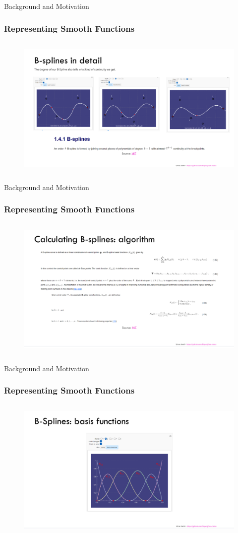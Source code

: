 \documentclass[serif, aspectratio=169]{beamer}
\begin{document}
\begin{frame}{Background and Motivation}
    \frametitle<presentation>{Representing Smooth Functions}
    \begin{figure}
        \centering
        \includegraphics[height=7cm]{image copy 3.png}
    \end{figure}
\end{frame}
\begin{frame}{Background and Motivation}
    \frametitle<presentation>{Representing Smooth Functions}
    \begin{figure}
        \centering
        \includegraphics[height=7cm]{image copy 4.png}
    \end{figure}
\end{frame}
\begin{frame}{Background and Motivation}
    \frametitle<presentation>{Representing Smooth Functions}
    \begin{figure}
        \centering
        \includegraphics[height=7cm]{image copy 5.png}
    \end{figure}
\end{frame}
\end{document}
